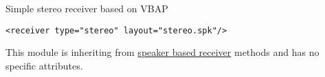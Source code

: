 Simple stereo receiver based on VBAP

\begin{lstlisting}[numbers=none]
<receiver type="stereo" layout="stereo.spk"/>
\end{lstlisting}

%

This module is inheriting from \hyperref[attrtab:speakerbased]{speaker
  based receiver} methods and has no specific attributes.
